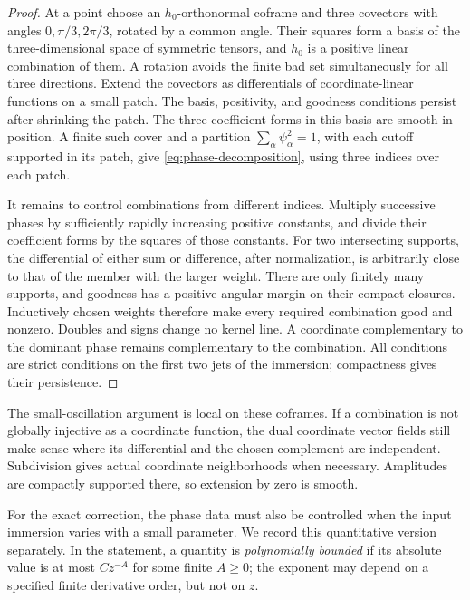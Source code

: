 \begin{proof}
At a point choose an $h_0$-orthonormal coframe and three covectors with angles
$0,\pi/3,2\pi/3$, rotated by a common angle. Their squares form a basis of the
three-dimensional space of symmetric tensors, and $h_0$ is a positive linear
combination of them. A rotation avoids the finite bad set simultaneously for
all three directions. Extend the covectors as differentials of coordinate-linear
functions on a small patch. The basis, positivity, and goodness conditions
persist after shrinking the patch. The three coefficient forms in this basis
are smooth in position. A finite such cover and a partition
$\sum_\alpha\psi_\alpha^2=1$, with each cutoff supported in its patch, give
\eqref{eq:phase-decomposition}, using three indices over each patch.

It remains to control combinations from different indices. Multiply successive
phases by sufficiently rapidly increasing positive constants, and divide their
coefficient forms by the squares of those constants. For two intersecting
supports, the differential of either sum or difference, after normalization,
is arbitrarily close to that of the member with the larger weight. There are
only finitely many supports, and goodness has a positive angular margin on
their compact closures. Inductively chosen weights therefore make every
required combination good and nonzero. Doubles and signs change no kernel
line. A coordinate complementary to the dominant phase remains complementary
to the combination. All conditions are strict conditions on the first two
jets of the immersion; compactness gives their persistence.
\end{proof}

The small-oscillation argument is local on these coframes. If a combination is
not globally injective as a coordinate function, the dual coordinate vector
fields still make sense where its differential and the chosen complement are
independent. Subdivision gives actual coordinate neighborhoods when necessary.
Amplitudes are compactly supported there, so extension by zero is smooth.

For the exact correction, the phase data must also be controlled when the
input immersion varies with a small parameter. We record this quantitative
version separately. In the statement, a quantity is \emph{polynomially bounded}
if its absolute value is at most $Cz^{-A}$ for some finite $A\ge0$; the exponent
may depend on a specified finite derivative order, but not on $z$.

